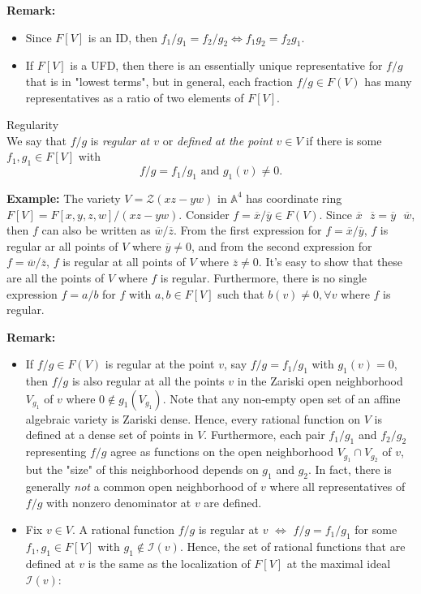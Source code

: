 \noindent\textbf{Remark:} \begin{itemize}
    \item Since $F[V]$ is an ID, then $f_1/g_1=f_2/g_2 \Leftrightarrow f_1g_2=f_2 g_1$.
    
    \item If $F[V]$ is a UFD, then there is an essentially unique representative for $f/g$ that is in "lowest terms", but in general, each fraction $f/g \in F(V)$ has many representatives as a ratio of two elements of $F[V]$.
\end{itemize}

\begin{definition}{Regularity}\\
We say that $f/g$ is \textit{regular at $v$} or \textit{defined at the point $v\in V$} if there is some $f_1,g_1 \in F[V]$ with
\[
f/g=f_1/g_1 \text{ and } g_1 (v) \neq 0.
\]
\end{definition}

\noindent\textbf{Example:} The variety $V= \mathcal{Z} (xz-yw)$ in $\mathbb{A}^4$ has coordinate ring $F[V]=F[x,y,z,w] /(xz-yw)$. Consider $f= \overline{x}/ \overline{y} \in F(V)$. Since $\overline{x}\text{ }\overline{z} = \overline{y}\text{ }\overline{w}$, then $f$ can also be written as $\overline{w}/\overline{z}$. From the first expression for $f= \overline{x}/\overline{y}$, $f$ is regular ar all points of $V$ where $\overline{y} \neq 0$, and from the second expression for $f= \overline{w}/\overline{z}$, $f$ is regular at all points of $V$ where $\overline{z} \neq 0$. It's easy to show that these are all the points of $V$ where $f$ is regular. Furthermore, there is no single expression $f=a/b$ for $f$ with $a,b \in F[V]$ such that $b(v) \neq 0, \forall v$ where $f$ is regular.

\noindent\textbf{Remark:} \begin{itemize}
    \item If $f/g \in F(V)$ is regular at the point $v$, say $f/g=f_1/g_1$ with $g_1(v)=0$, then $f/g$ is also regular at all the points $v$ in the Zariski open neighborhood $V_{g_1}$ of $v$ where $0\notin g_1 (V_{g_1})$. Note that any non-empty open set of an affine algebraic variety is Zariski dense. Hence, every rational function on $V$ is defined at a dense set of points in $V$. Furthermore, each pair $f_1/g_1$ and $f_2/g_2$ representing $f/g$ agree as functions on the open neighborhood $V_{g_1} \cap V_{g_2}$ of $v$, but the "size" of this neighborhood depends on $g_1$ and $g_2$. In fact, there is generally \textit{not} a common open neighborhood of $v$ where all representatives of $f/g$ with nonzero denominator at $v$ are defined.

    \item Fix $v\in V$. A rational function $f/g$ is regular at $v$ $\Leftrightarrow$ $f/g=f_1/g_1$ for some $f_1,g_1 \in F[V]$ with $g_1 \notin \mathcal{I} (v)$. Hence, the set of rational functions that are defined at $v$ is the same as the localization of $F[V]$ at the maximal ideal $\mathcal{I} (v)$:
\end{itemize}

